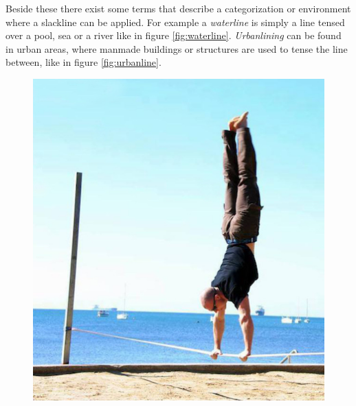 Beside these there exist some terms that describe a categorization or environment where a slackline can be applied. For example a \textit{waterline} is simply a line tensed over a pool, sea or a river like in figure \ref{fig:waterline}. \textit{Urbanlining} can be found in urban areas, where manmade buildings or structures are used to tense the line between, like in figure \ref{fig:urbanline}.
\begin{figure}[htb]
	\centering
	\begin{minipage}[t]{0.45\linewidth}
		\centering
		\includegraphics[width=1\linewidth]{Pictures/3_1_trickline}
		\label{fig:trickline}
	\end{minipage}
	\hfill
	\begin{minipage}[t]{0.45\linewidth}
		\centering

\end{minipage}
\end{figure}
